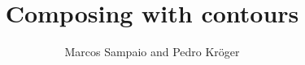 \documentclass[12pt]{article}
\begin{document}
\title{Composing with contours}
\author{Marcos Sampaio and Pedro Kröger}

\maketitle

\thispagestyle{empty}

\begin{abstract}
  
\end{abstract}

\doublespacing


\singlespacing



\end{document}
